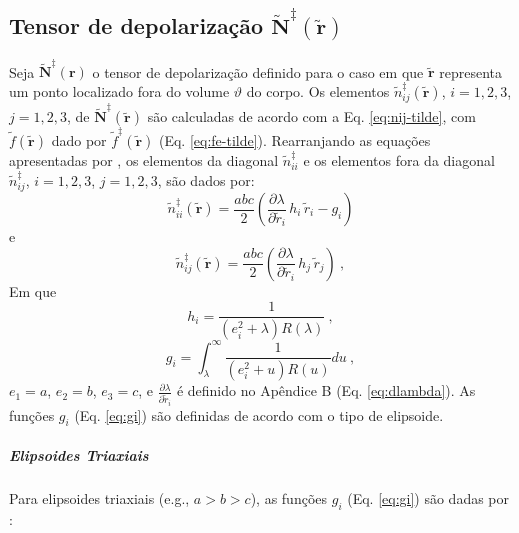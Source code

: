 \subsection{Tensor de depolarização $\tilde{\mathbf{N}}^{\ddagger}(\tilde{\mathbf{r}})$}

Seja $\tilde{\mathbf{N}}^{\ddagger}(\mathbf{r})$ o tensor de depolarização definido para o caso em que $\tilde{\mathbf{r}}$ representa um ponto localizado fora do volume $\vartheta$ do corpo. Os elementos $\tilde{n}^{\ddagger}_{ij}(\tilde{\mathbf{r}})$,
$i = 1, 2, 3$, $j = 1, 2, 3$, de $\tilde{\mathbf{N}}^{\ddagger}(\tilde{\mathbf{r}})$ são calculadas de acordo com a Eq. \ref{eq:nij-tilde}, com 
$\tilde{f}(\tilde{\mathbf{r}})$ dado por $\tilde{f}^{\ddagger}(\tilde{\mathbf{r}})$
(Eq. \ref{eq:fe-tilde}).
Rearranjando as equações apresentadas por \citet{clark1986}, os elementos da diagonal $\tilde{n}^{\ddagger}_{ii}$
e os elementos fora da diagonal $\tilde{n}^{\ddagger}_{ij}$, $i = 1, 2, 3$,
$j = 1, 2, 3$, são dados por:
\begin{equation}
\tilde{n}^{\ddagger}_{ii}(\tilde{\mathbf{r}}) =
\frac{abc}{2}
\left( \frac{\partial \lambda}{\partial \tilde{r}_{i}} \, h_{i} \, \tilde{r}_{i}
- g_{i} \right)
\label{eq:n-tilde-ddagger-ii}
\end{equation}
e
\begin{equation}
\tilde{n}^{\ddagger}_{ij}(\tilde{\mathbf{r}}) =
\frac{abc}{2} \left(
\frac{\partial \lambda}{\partial \tilde{r}_{i}} \, h_{j} \, \tilde{r}_{j} 
\right) \: ,
\label{eq:n-tilde-dagger-ij}
\end{equation}
Em que
\begin{equation}
h_{i} = \frac{1}{\left( e_{i}^{2} + \lambda \right) R(\lambda)} \: ,
\label{eq:hi}
\end{equation}
\begin{equation}
g_{i} = \int_{\lambda}^{\infty} \frac{1}{\left( e_{i}^{2} + u \right) R(u)} du \: ,
\label{eq:gi}
\end{equation}
$e_{1} = a$, $e_{2} = b$, $e_{3} = c$, e 
$\frac{\partial \lambda}{\partial \tilde{r}_{i}}$
é definido no Apêndice B (Eq. \ref{eq:dlambda}).
As funções $g_{i}$ (Eq. \ref{eq:gi}) são definidas de acordo com
o tipo de elipsoide.

\subparagraph*{Elipsoides Triaxiais}

Para elipsoides triaxiais  (e.g., $a > b > c$), as funções
$g_{i}$ (Eq. \ref{eq:gi}) são dadas por
\citep{clark1986}:

